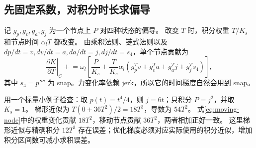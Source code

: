 \subsection{先固定系数，对积分时长求偏导}
记 $g_p,g_v,g_a,g_j$ 为一个节点上 $P$ 对四种状态的偏导。
改变 $T$ 时，积分权重 $T/K_s$ 和节点时间 $\alpha_lT$ 都改变。
由乘积法则、链式法则以及 $dp/dt=v,dv/dt=a,da/dt=j,dj/dt=s_4$，单个节点贡献为
\begin{equation}
 \left.\frac{\partial K}{\partial T}\right|_C\mathrel{+}=
 \omega_l\left[\frac{P}{K_s}+\frac{T}{K_s}\alpha_l
 (g_p^Tv+g_v^Ta+g_a^Tj+g_j^Ts_4)\right],
 \label{eq:moving-node}
\end{equation}
其中 $s_4=p''''$ 为 snap。力变化率依赖 jerk，所以它的时间梯度自然会用到 snap。

用一个标量小例子检查：取 $p(t)=t^4/4$，则 $j=6t$；只积分 $P=j^2$，并取 $K_s=1$。
梯形近似为 $T(0+36T^2)/2=18T^3$，导数为 $54T^2$。
式\eqref{eq:moving-node}中的权重变化贡献 $18T^2$，移动节点贡献 $36T^2$，两者相加正好一致。
这里梯形近似与精确积分 $12T^3$ 存在误差；优化梯度必须对应实际使用的积分近似，增加积分区间数可减小求积误差。

